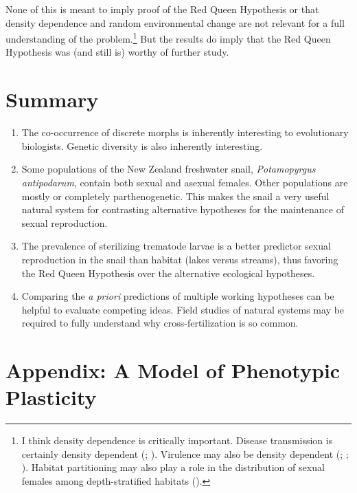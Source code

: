 \documentclass[
  letterpaper,
]{book}
\begin{document}
None of this is meant to imply proof of the Red Queen Hypothesis or that
density dependence and random environmental change are not relevant for
a full understanding of the problem.\footnote{I think density dependence
  is critically important. Disease transmission is certainly density
  dependent (;
  ). Virulence may also be
  density dependent (;
  ;
  ). Habitat partitioning may
  also play a role in the distribution of sexual females among
  depth-stratified habitats ().} But the results do imply that the Red Queen Hypothesis
was (and still is) worthy of further study.

\section{Summary}\label{summary-2}

\begin{enumerate}
\def\labelenumi{\arabic{enumi}.}
\item
  The co-occurrence of discrete morphs is inherently interesting to
  evolutionary biologists. Genetic diversity is also inherently
  interesting.
\item
  Some populations of the New Zealand freshwater snail,
  \emph{Potamopyrgus antipodarum}, contain both sexual and asexual
  females. Other populations are mostly or completely parthenogenetic.
  This makes the snail a very useful natural system for contrasting
  alternative hypotheses for the maintenance of sexual reproduction.
\item
  The prevalence of sterilizing trematode larvae is a better predictor
  sexual reproduction in the snail than habitat (lakes versus streams),
  thus favoring the Red Queen Hypothesis over the alternative ecological
  hypotheses.
\item
  Comparing the \emph{a priori} predictions of multiple working
  hypotheses can be helpful to evaluate competing ideas. Field studies
  of natural systems may be required to fully understand why
  cross-fertilization is so common.
\end{enumerate}

\section{Appendix: A Model of Phenotypic Plasticity}\label{sec-app-3}
\end{document}
